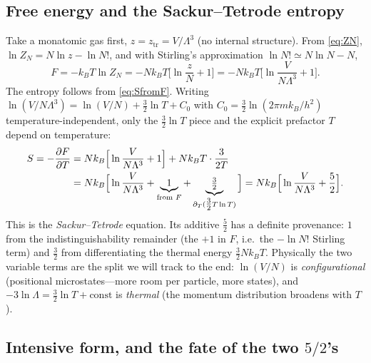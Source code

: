 \documentclass[11pt,a4paper]{article}
\theoremstyle{definition}
\begin{document}
\subsection{Free energy and the Sackur--Tetrode entropy}\label{ssec:sackur}

Take a monatomic gas first, $z=z_{\mathrm{tr}}=V/\Lambda^{3}$ (no internal
structure). From \eqref{eq:ZN}, $\ln Z_N=N\ln z-\ln N!$, and with Stirling's
approximation $\ln N!\simeq N\ln N-N$,
\begin{equation}\label{eq:Fmon}
F=-k_BT\ln Z_N
=-N k_BT\Big[\ln\frac{z}{N}+1\Big]
=-N k_BT\Big[\ln\frac{V}{N\Lambda^{3}}+1\Big].
\end{equation}
The entropy follows from \eqref{eq:SfromF}. Writing
$\ln(V/N\Lambda^{3})=\ln(V/N)+\tfrac32\ln T+C_0$ with
$C_0=\tfrac32\ln(2\pi m k_B/h^{2})$ temperature-independent, only the
$\tfrac32\ln T$ piece and the explicit prefactor $T$ depend on temperature:
\begin{align}
S=-\frac{\partial F}{\partial T}
&=N k_B\Big[\ln\frac{V}{N\Lambda^{3}}+1\Big]
 +N k_BT\cdot\frac{3}{2T} \notag\\
&=N k_B\Big[\ln\frac{V}{N\Lambda^{3}}+\underbrace{1}_{\text{from }F}
      +\underbrace{\tfrac32}_{\partial_T(\tfrac32 T\ln T)}\Big]
 =N k_B\Big[\ln\frac{V}{N\Lambda^{3}}+\frac{5}{2}\Big].
\label{eq:sackur}
\end{align}
This is the \emph{Sackur--Tetrode} equation. Its additive $\tfrac52$ has a
definite provenance: $1$ from the indistinguishability remainder (the $+1$ in
$F$, i.e.\ the $-\ln N!$ Stirling term) and $\tfrac32$ from differentiating the
thermal energy $\tfrac32 N k_BT$. Physically the two variable terms are the
split we will track to the end: $\ln(V/N)$ is \emph{configurational} (positional
microstates---more room per particle, more states), and
$-3\ln\Lambda=\tfrac32\ln T+\mathrm{const}$ is \emph{thermal} (the momentum
distribution broadens with $T$).

\subsection{Intensive form, and the fate of the two \texorpdfstring{$5/2$}{5/2}'s}
\label{ssec:intensive}
\end{document}
